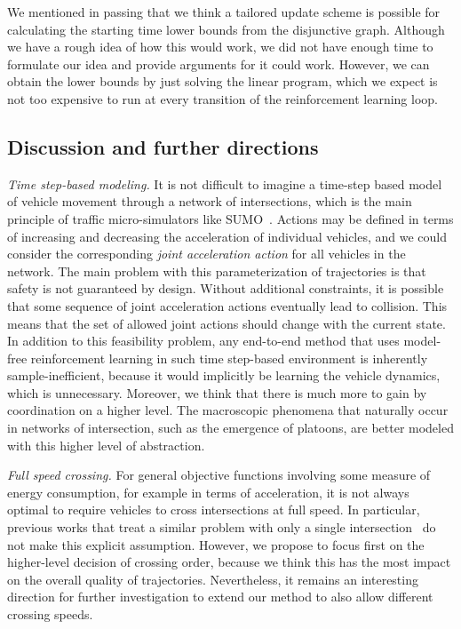 \documentclass{article}
\theoremstyle{definition}
\theoremstyle{plain}
\begin{document}
We mentioned in passing that we think a tailored update scheme is possible for
calculating the starting time lower bounds from the disjunctive graph. Although
we have a rough idea of how this would work, we did not have enough time to
formulate our idea and provide arguments for it could work. However, we can
obtain the lower bounds by just solving the linear program, which we expect is
not too expensive to run at every transition of the reinforcement learning loop.

\subsection{Discussion and further directions}


\textit{Time step-based modeling.}
%
It is not difficult to imagine a time-step based model of vehicle movement through
a network of intersections, which is the main principle of traffic
micro-simulators like SUMO~\cite{lopezMicroscopicTrafficSimulation2018}. Actions may be defined in terms of increasing
and decreasing the acceleration of individual vehicles, and we could consider the
corresponding \textit{joint acceleration action} for all vehicles in the network.
%
The main problem with this parameterization of trajectories is that safety is
not guaranteed by design. Without additional constraints, it is possible that
some sequence of joint acceleration actions eventually lead to collision. This
means that the set of allowed joint actions should change with the current
state.
%
In addition to this feasibility problem, any end-to-end method that uses
model-free reinforcement learning in such time step-based environment is
inherently sample-inefficient, because it would implicitly be learning the
vehicle dynamics, which is unnecessary.
%
Moreover, we think that there is much more to gain by coordination on a higher
level. The macroscopic phenomena that naturally occur in networks of
intersection, such as the emergence of platoons, are better modeled with this
higher level of abstraction.

\vspace{0.5em}\noindent
\textit{Full speed crossing.} For general objective functions involving some
measure of energy consumption, for example in terms of acceleration, it is not
always optimal to require vehicles to cross intersections at full speed. In
particular, previous works that treat a similar problem with only a single
intersection~\cite{hultApproximateSolutionOptimal2015,zhaoBilevelProgrammingModel2021}
do not make this explicit assumption. However, we propose to focus first on the
higher-level decision of crossing order, because we think this has the most impact
on the overall quality of trajectories. Nevertheless, it remains an interesting
direction for further investigation to extend our method to also allow different
crossing speeds.
\end{document}
